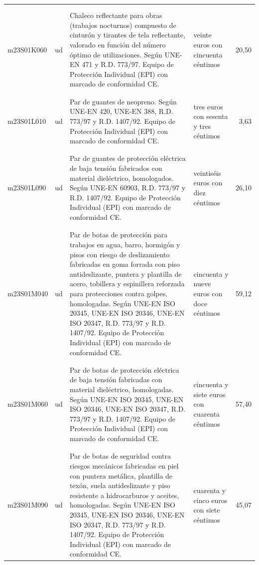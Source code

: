\documentclass{book}%
\begin{document}
\begin{longtable}{|l|l|p{5cm}|p{3cm}|r|}
&&&&\\%
&&&&\\%
m23S01K060&ud&Chaleco reflectante para obras (trabajos nocturnos) compuesto de cinturón y tirantes de tela reflectante, valorado en función del número óptimo de utilizaciones. Según UNE{-}EN 471 y R.D. 773/97. Equipo de Protección Individual (EPI) con marcado de conformidad CE.&veinte euros con cincuenta céntimos&20,50\\%
&&&&\\%
&&&&\\%
m23S01L010&ud&Par de guantes de neopreno. Según UNE{-}EN 420, UNE{-}EN 388, R.D. 773/97 y R.D. 1407/92. Equipo de Protección Individual (EPI) con marcado de conformidad CE.&tres euros con sesenta y tres céntimos&3,63\\%
&&&&\\%
&&&&\\%
m23S01L090&ud&Par de guantes de protección eléctrica de baja tensión fabricados con material dieléctrico, homologados. Según UNE{-}EN 60903, R.D. 773/97 y R.D. 1407/92. Equipo de Protección Individual (EPI) con marcado de conformidad CE.&veintiséis euros con diez céntimos&26,10\\%
&&&&\\%
&&&&\\%
m23S01M040&ud&Par de botas de protección para trabajos en agua, barro, hormigón y pisos con riesgo de deslizamiento fabricadas en goma forrada con piso antideslizante, puntera y plantilla de acero, tobillera y espinillera reforzada para protecciones contra golpes, homologadas. Según UNE{-}EN ISO 20345, UNE{-}EN ISO 20346, UNE{-}EN ISO 20347, R.D. 773/97 y R.D. 1407/92. Equipo de Protección Individual (EPI) con marcado de conformidad CE.&cincuenta y nueve euros con doce céntimos&59,12\\%
&&&&\\%
&&&&\\%
m23S01M060&ud&Par de botas de protección eléctrica de baja tensión fabricadas con material dieléctrico, homologadas. Según UNE{-}EN ISO 20345, UNE{-}EN ISO 20346, UNE{-}EN ISO 20347, R.D. 773/97 y R.D. 1407/92. Equipo de Protección Individual (EPI) con marcado de conformidad CE.&cincuenta y siete euros con cuarenta céntimos&57,40\\%
&&&&\\%
&&&&\\%
m23S01M090&ud&Par de botas de seguridad contra riesgos mecánicos fabricadas en piel con puntera metálica, plantilla de texón, suela antideslizante y piso resistente a hidrocarburos y aceites, homologadas. Según UNE{-}EN ISO 20345, UNE{-}EN ISO 20346, UNE{-}EN ISO 20347, R.D. 773/97 y R.D. 1407/92. Equipo de Protección Individual (EPI) con marcado de conformidad CE.&cuarenta y cinco euros con siete céntimos&45,07\\%

\end{longtable}
\end{document}
